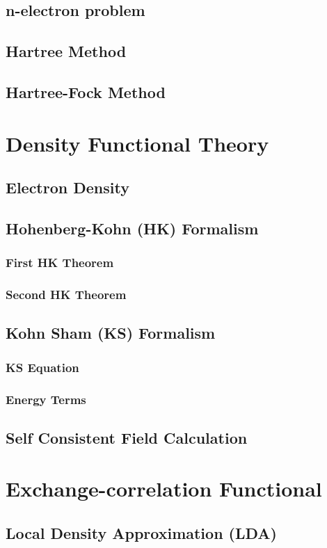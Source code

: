     \subsection{n-electron problem}
    \subsection{Hartree Method}
    \subsection{Hartree-Fock Method}
\section{Density Functional Theory}
    \subsection{Electron Density}
    \subsection{Hohenberg-Kohn (HK) Formalism}
    \subsubsection{First HK Theorem}
        \subsubsection{Second HK Theorem}
    \subsection{Kohn Sham (KS) Formalism}
        \subsubsection{KS Equation}
        \subsubsection{Energy Terms}
    \subsection{Self Consistent Field Calculation}
\section{Exchange-correlation Functional}
    \subsection{Local Density Approximation (LDA)}
